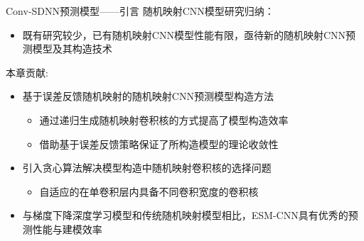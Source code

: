 \begin{frame}{Conv-SDNN预测模型——引言}
    随机映射CNN模型研究归纳：
    \begin{itemize}
        \item 既有研究较少，已有随机映射CNN模型性能有限，亟待新的随机映射CNN预测模型及其构造技术
    \end{itemize}

    \vspace*{0.5em}
    本章贡献:
    \begin{itemize}
        \item 基于误差反馈随机映射的随机映射CNN预测模型构造方法
              \begin{itemize}
                  \item 通过递归生成随机映射卷积核的方式提高了模型构造效率
                  \item 借助基于误差反馈策略保证了所构造模型的理论收敛性
              \end{itemize}
        \item 引入贪心算法解决模型构造中随机映射卷积核的选择问题
              \begin{itemize}
                  \item 自适应的在单卷积层内具备不同卷积宽度的卷积核
              \end{itemize}
        \item 与梯度下降深度学习模型和传统随机映射模型相比，ESM-CNN具有优秀的预测性能与建模效率
    \end{itemize}

\end{frame}


